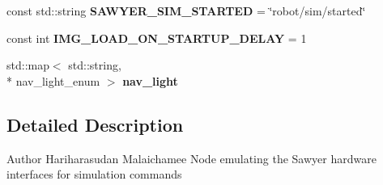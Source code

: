 \begin{DoxyCompactItemize}
\item 
\hypertarget{namespacesawyer__en_ae8e8aef2ef048105e9f38b68db0e0de1}{const std\-::string {\bfseries S\-A\-W\-Y\-E\-R\-\_\-\-S\-I\-M\-\_\-\-S\-T\-A\-R\-T\-E\-D} = \char`\"{}robot/sim/started\char`\"{}}\label{namespacesawyer__en_ae8e8aef2ef048105e9f38b68db0e0de1}

\item 
\hypertarget{namespacesawyer__en_a68c146e7b577f3f17fe6755df334a57f}{const int {\bfseries I\-M\-G\-\_\-\-L\-O\-A\-D\-\_\-\-O\-N\-\_\-\-S\-T\-A\-R\-T\-U\-P\-\_\-\-D\-E\-L\-A\-Y} = 1}\label{namespacesawyer__en_a68c146e7b577f3f17fe6755df334a57f}

\item 
\hypertarget{namespacesawyer__en_a9b587057c4e921a82ac2a86252cfe48b}{std\-::map$<$ std\-::string, \\*
nav\-\_\-light\-\_\-enum $>$ {\bfseries nav\-\_\-light}}\label{namespacesawyer__en_a9b587057c4e921a82ac2a86252cfe48b}

\end{DoxyCompactItemize}


\subsection{Detailed Description}
\begin{DoxyAuthor}{Author}
Hariharasudan Malaichamee  Node emulating the Sawyer hardware interfaces for simulation commands 
\end{DoxyAuthor}
